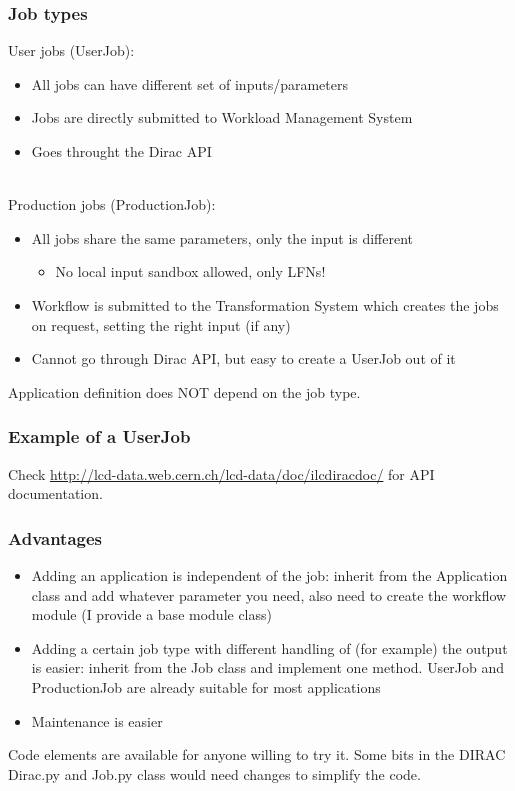 \documentclass{beamer}
\begin{document}
\begin{frame}
  \frametitle{Job types}
User jobs (UserJob):
\begin{itemize}
\item All jobs can have different set of inputs/parameters
\item Jobs are directly submitted to Workload Management System
\item Goes throught the Dirac API
\end{itemize}
~\\
Production jobs (ProductionJob):
\begin{itemize}
\item All jobs share the same parameters, only the input is
  different
  \begin{itemize}
  \item No local input sandbox allowed, only LFNs!
  \end{itemize}
\item Workflow is submitted to the Transformation System which creates
  the jobs on request, setting the right input (if any) 
\item Cannot go through Dirac API, but easy to create a UserJob out of it
\end{itemize}
\alert{Application definition does NOT depend on the job type.}
\end{frame}

\begin{frame}
  \frametitle{Example of a UserJob}

Check \url{http://lcd-data.web.cern.ch/lcd-data/doc/ilcdiracdoc/} for API documentation.
\end{frame}
\begin{frame}
  \frametitle{Advantages}
\begin{itemize}
\item Adding an application is independent of the job: \alert{inherit from
  the Application class} and add whatever parameter you need, also need
  to create the workflow module (I provide a base module class)
\item Adding a certain job type with different handling of (for
  example) the output is easier: \alert{inherit from the Job class} and
  implement one method. \alert{UserJob and ProductionJob} are already suitable
  for most applications
\item \alert{Maintenance} is easier
\end{itemize}
Code elements are available for anyone willing to try it. Some bits in
the DIRAC Dirac.py and Job.py class would need changes to simplify the
code.
\end{frame}
\end{document}
